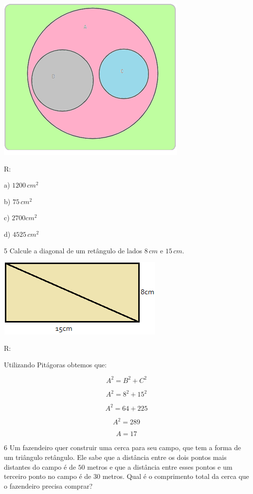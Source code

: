 \includegraphics[width=3.70833in,height=3.22917in]{./imgSAEB_6_MAT/media/image54.png}

R:

a) $1200\,cm^2$

b) $75\,cm^2$

c) $2700cm^2$

d) $4525\,cm^2$

\num{5}  Calcule a diagonal de um retângulo de lados $8\,cm$ e $15\,cm$.

\includegraphics[width=3.24444in,height=1.54653in]{./imgSAEB_6_MAT/media/image55.png}

R:

Utilizando Pitágoras obtemos que:

$$A^2= B^2+ C^2$$

$$A^2= 8^2 + 15^2$$

$$A^2= 64 + 225$$

$$A^2= 289$$

$$A = 17$$

\num{6}  Um fazendeiro quer construir uma cerca para seu campo, que tem a
forma de um triângulo retângulo. Ele sabe que a distância entre os dois
pontos mais distantes do campo é de $50$ metros e que a distância entre
esses pontos e um terceiro ponto no campo é de $30$ metros. Qual é o
comprimento total da cerca que o fazendeiro precisa comprar?

